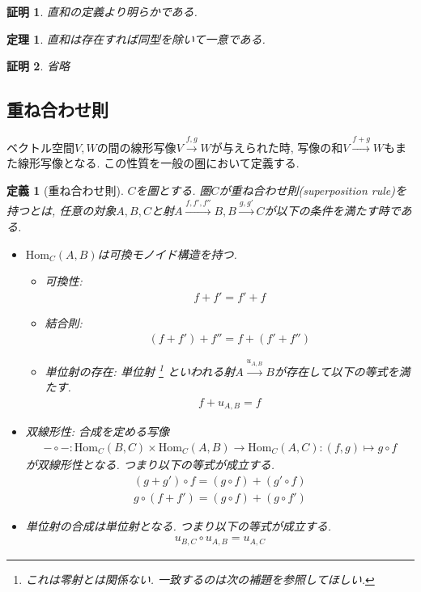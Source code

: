 \documentclass[a4paper,12pt]{ltjsarticle}
\theoremstyle{break}
\newtheorem{defn}[thm]{定義}
\newtheorem{thrm}[thm]{定理}
\newtheorem*{prf}{証明}
\newcommand{\Hom}{\mathrm{Hom}}
\newcommand{\xr}[1]{\xrightarrow{#1}}
\newcommand{\ci}{\circ}
\newcommand{\ti}{\times}
\numberwithin{equation}{section}
\begin{document}
\begin{prf}
  直和の定義より明らかである. 
\end{prf}

\begin{thrm}
  直和は存在すれば同型を除いて一意である. 
\end{thrm}

\begin{prf}
  省略
\end{prf}

\subsection{重ね合わせ則}

ベクトル空間$V,W$の間の線形写像$V \xr{f,g} W$が与えられた時, 写像の和$V \xr{f+g} W$もまた線形写像となる. 
この性質を一般の圏において定義する. 

\begin{defn}[重ね合わせ則]
  $C$を圏とする. 
  圏$C$が重ね合わせ則(superposition rule)を持つとは, 任意の対象$A,B,C$と射$A \xr{f,f',f''} B, B \xr{g,g'} C$が以下の条件を満たす時である.   
  \begin{itemize}
  \item $\Hom_C(A,B)$は可換モノイド構造を持つ. 
  \begin{itemize}
    \item 可換性: \begin{align*} f+f'=f'+f \end{align*}
    \item 結合則: \begin{align*} (f+f')+f''=f+(f'+f'') \end{align*}
    \item 単位射の存在: 単位射
    \footnote{
      これは零射とは関係ない. 一致するのは次の補題を参照してほしい. 
      }
    といわれる射$A \xr{u_{A,B}} B$が存在して以下の等式を満たす. 
    \begin{align*} f+u_{A,B}=f \end{align*}
  \end{itemize}
  \item 双線形性: 合成を定める写像
    \begin{align*} 
      - \ci -: \Hom_C(B,C) \ti \Hom_C(A,B) \to \Hom_C(A,C): (f,g) \mapsto g \ci f 
    \end{align*}
    が双線形性となる. 
    つまり以下の等式が成立する. 
    \begin{align*}
      (g+g') \ci f=(g \ci f)+(g' \ci f) \\ 
      g \ci (f+f')=(g \ci f)+(g \ci f') 
    \end{align*}
  \item 単位射の合成は単位射となる. 
  つまり以下の等式が成立する. 
    \begin{align*} 
      u_{B,C} \ci u_{A,B} = u_{A,C} 
    \end{align*}
  \end{itemize}
\end{defn}  
\end{document}
